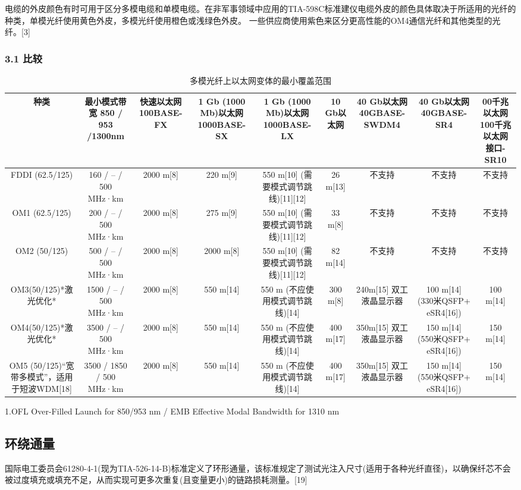 电缆的外皮颜色有时可用于区分多模电缆和单模电缆。在非军事领域中应用的TIA-598C标准建仪电缆外皮的颜色具体取决于所适用的光纤的种类，单模光纤使用黄色外皮，多模光纤使用橙色或浅绿色外皮。 一些供应商使用紫色来区分更高性能的OM4通信光纤和其他类型的光纤。[3]

\subsubsection{3.1 比较 }
\begin{table}[ht]
\centering
\caption{多模光纤上以太网变体的最小覆盖范围}\label{tab_DMGQ1}
\begin{tabular}{|c|c|c|c|c|c|c|c|c|}
\hline
种类 & 最小模式带宽 
850 / 953 /1300nm& 快速以太网100BASE-FX & 1 Gb (1000 Mb)以太网1000BASE-SX & 1 Gb (1000 Mb)以太网1000BASE-LX & 10 Gb以太网 & 40 Gb以太网
40GBASE-SWDM4& 40 Gb以太网40GBASE-SR4 &00千兆以太网100千兆以太网接口-SR10 \\
\hline
FDDI (62.5/125) &160 / – / 500 MHz·km& 2000 m[8] &220 m[9] & 550 m[10] (需要模式调节跳线)[11][12]& 26 m[13] & 不支持& 不支持 & 不支持 \\
\hline
OM1 (62.5/125) & 200 / – / 500 MHz·km &2000 m[8]& 275 m[9] & 550 m[10] (需要模式调节跳线)[11][12] & 33 m[8]& 不支持 & 不支持 & 不支持 \\
\hline
OM2 (50/125)& 500 / – / 500 MHz·km &2000 m[8]& 2000 m[8] & 550 m[10] (需要模式调节跳线)[11][12]& 82 m[14]&不支持 &不支持& 不支持\\
\hline
OM3(50/125)*激光优化* & 1500 / – / 500 MHz·km & 2000 m[8] & 550 m[14] &550 m (不应使用模式调节跳线)[14]& 300 m[8]& 240m[15]
双工液晶显示器& 100 m[14]
(330米QSFP+ eSR4[16]) & 100 m[14]\\
\hline
OM4(50/125)*激光优化* &3500 / – / 500 MHz·km& 2000 m[8] & 550 m[14]&550 m (不应使用模式调节跳线)[14] & 400 m[17]&350m[15]
双工液晶显示器& 150 m[14]
(550米QSFP+ eSR4[16])&150 m[14]\\
\hline
OM5 (50/125)“宽带多模式”，适用于短波WDM[18] & 3500 / 1850 / 500  MHz·km & 2000 m[8] & 550 m[14]&550 m (不应使用模式调节跳线)[14] & 400 m[17]&350m[15]
双工液晶显示器& 150 m[14]
(550米QSFP+ eSR4[16])&150 m[14]\\
\hline
\end{tabular}
\end{table}
1.OFL Over-Filled Launch for 850/953 nm / EMB Effective Modal Bandwidth for 1310 nm
\subsection{环绕通量}
国际电工委员会61280-4-1(现为TIA-526-14-B)标准定义了环形通量，该标准规定了测试光注入尺寸(适用于各种光纤直径)，以确保纤芯不会被过度填充或填充不足，从而实现可更多次重复(且变量更小)的链路损耗测量。[19]

